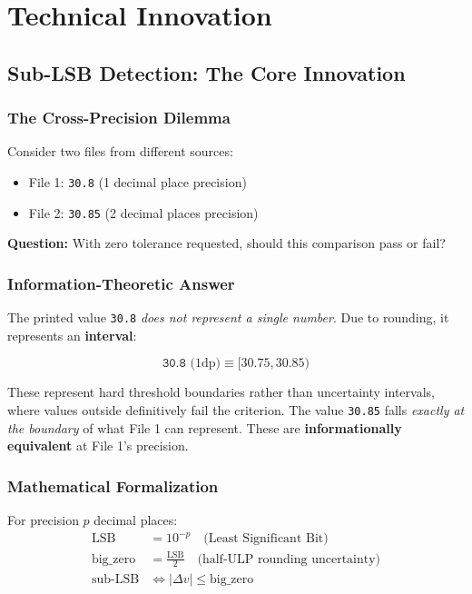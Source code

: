 \documentclass[11pt,letterpaper]{article}
\newcommand{\LSB}{\mathrm{LSB}}
\begin{document}
\section{Technical Innovation}
\label{sec:innovation}

\subsection{Sub-LSB Detection: The Core Innovation}

\subsubsection{The Cross-Precision Dilemma}

Consider two files from different sources:
\begin{itemize}
    \item File 1: \texttt{30.8} (1 decimal place precision)
    \item File 2: \texttt{30.85} (2 decimal places precision)
\end{itemize}

\noindent\textbf{Question:} With zero tolerance requested, should this comparison pass or fail?

\subsubsection{Information-Theoretic Answer}

The printed value \texttt{30.8} \emph{does not represent a single number}. Due to rounding, it represents an \textbf{interval}:

\begin{equation}
    \texttt{30.8} \text{ (1dp)} \equiv [30.75, 30.85)
\end{equation}

These represent hard threshold boundaries rather than uncertainty intervals, where values outside definitively fail the criterion. The value \texttt{30.85} falls \emph{exactly at the boundary} of what File 1 can represent. These are \textbf{informationally equivalent} at File 1's precision.

\subsubsection{Mathematical Formalization}

For precision $p$ decimal places:
\begin{align}
    \LSB &= 10^{-p} \quad \text{(Least Significant Bit)} \\
    \text{big\_zero} &= \frac{\LSB}{2} \quad \text{(half-ULP rounding uncertainty)} \\
    \text{sub-LSB} &\iff |\Delta v| \leq \text{big\_zero}
\end{align}
\end{document}

